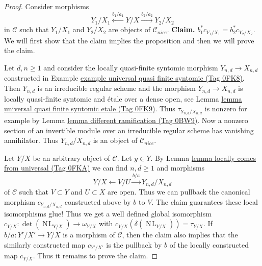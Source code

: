 \documentclass{amsart}
\theoremstyle{plain}
\theoremstyle{definition}
\theoremstyle{remark}
\numberwithin{equation}{subsection}
\def\NL{\mathop{N\!L}\nolimits}
\begin{document}
\begin{proof}
\medskip\noindent
Consider morphisms
$$
Y_1/X_1 \xleftarrow{b_1/a_1} Y/X \xrightarrow{b_2/a_2} Y_2/X_2
$$
in $\mathcal{C}$ such that $Y_1/X_1$ and $Y_2/X_2$ are objects
of $\mathcal{C}_{nice}$. {\bf Claim.} $b_1^*c_{Y_1/X_1} = b_2^*c_{Y_2/X_2}$.
We will first show that the claim implies the proposition
and then we will prove the claim.

\medskip\noindent
Let $d, n \geq 1$ and consider the locally
quasi-finite syntomic morphism $Y_{n, d} \to X_{n, d}$
constructed in Example \href{https://stacks.math.columbia.edu/tag/0FK8}{example universal quasi finite syntomic (Tag 0FK8)}.
Then $Y_{n, d}$ is an irreducible regular scheme and the
morphism $Y_{n, d} \to X_{n, d}$ is locally quasi-finite syntomic
and \'etale over a dense open, see
Lemma \href{https://stacks.math.columbia.edu/tag/0FK9}{lemma universal quasi finite syntomic etale (Tag 0FK9)}.
Thus $\tau_{Y_{n, d}/X_{n, d}}$ is nonzero for example by
Lemma \href{https://stacks.math.columbia.edu/tag/0BW9}{lemma different ramification (Tag 0BW9)}. Now a nonzero section
of an invertible module over an irreducible regular scheme
has vanishing annihilator. Thus
$Y_{n, d}/X_{n, d}$ is an object of $\mathcal{C}_{nice}$.

\medskip\noindent
Let $Y/X$ be an arbitrary object of $\mathcal{C}$. Let $y \in Y$.
By Lemma \href{https://stacks.math.columbia.edu/tag/0FKA}{lemma locally comes from universal (Tag 0FKA)} we can find
$n, d \geq 1$ and morphisms
$$
Y/X \leftarrow V/U \xrightarrow{b/a} Y_{n, d}/X_{n, d}
$$
of $\mathcal{C}$ such that $V \subset Y$ and $U \subset X$ are open.
Thus we can pullback the canonical morphism $c_{Y_{n, d}/X_{n, d}}$
constructed above by $b$ to $V$. The claim guarantees these local
isomorphisms glue! Thus we get a well defined global isomorphism
$c_{Y/X} : \det(\NL_{Y/X}) \to \omega_{Y/X}$ with
$c_{Y/X}(\delta(\NL_{Y/X})) = \tau_{Y/X}$.
If $b/a : Y'/X' \to Y/X$ is a morphism of $\mathcal{C}$, then
the claim also implies that the similarly constructed map
$c_{Y'/X'}$ is the pullback by $b$ of the locally constructed
map $c_{Y/X}$. Thus it remains to prove the claim.


\end{proof}
\end{document}
